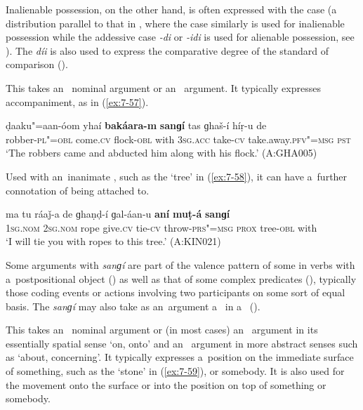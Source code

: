 Inalienable possession, on the other hand, is often expressed with the  case (a distribution parallel to that in \iliKohistani \iliShina, where the  case similarly is used for inalienable possession while the addessive case \textit{-di} or \textit{-idi} is used for alienable possession, see \citealt[65, 69--70]{schmidtkohistani2008}). The  \textit{díi} is also used to express the comparative degree of the standard of comparison ().


 This  takes an~ nominal argument or an~  argument. It typically expresses accompaniment, as in (\ref{ex:7-57}).

\ea
\label{ex:7-57}
\gll ḍaaku"=aan-óom yhaí \textbf{bakáara-m} \textbf{sanɡí} tas ɡhaš-í híṛ-u de \\
robber-\textsc{pl"=obl} come.\textsc{cv} flock-\textsc{obl}  with \textsc{3sg.acc} take-\textsc{cv} take.away.\textsc{pfv"=msg} \textsc{pst} \\
\glt `The robbers came and abducted him along with his flock.' (A:GHA005)
\z

Used with an~inanimate , such as the `tree' in (\ref{ex:7-58}), it can have a~further connotation of being attached to.

\begin{exe}
\ex
\label{ex:7-58}
\gll ma tu ráaǰ-a de ɡhaṇḍ-í ɡal-áan-u \textbf{aní} \textbf{muṭ-á} \textbf{sanɡí} \\
\textsc{1sg.nom} \textsc{2sg.nom} rope give.\textsc{cv} tie-\textsc{cv} throw-\textsc{prs"=msg} \textsc{prox} tree-\textsc{obl} with \\
\glt `I will tie you with ropes to this tree.' (A:KIN021)
\end{exe}

Some arguments with \textit{sanɡí} are part of the valence pattern of some in verbs with a~postpositional object () as well as that of some complex predicates (), typically those coding events or actions involving two participants on some sort of equal basis. The  \textit{sanɡí} may also take as an~argument a~ in a~  ().


 This  takes an~ nominal argument or (in most cases) an~  argument in its essentially spatial sense `on, onto' and an~  argument in more abstract senses such as `about, concerning'. It typically expresses a~position on the immediate surface of something, such as the `stone' in (\ref{ex:7-59}), or somebody. It is also used for the movement onto the surface or into the position on top of something or somebody.

